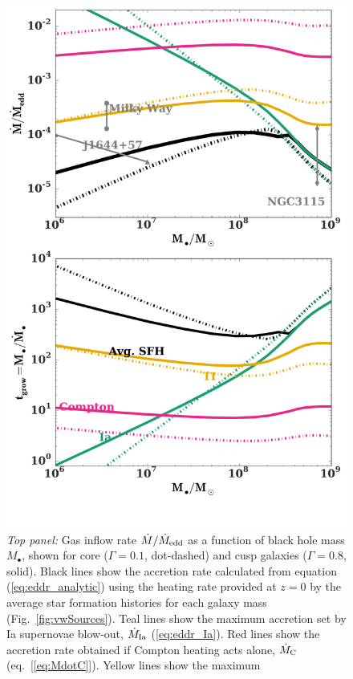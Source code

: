 \documentclass[usenatbib,fleqn]{mn2e}
\begin{document}
\begin{figure}
\includegraphics[width=\columnwidth]{mdot_sfr.pdf}
\caption{\label{fig:bh_growth} {\it Top panel:} Gas inflow rate $\dot{M}/\dot{M}_{\rm edd}$ as a
  function of black hole mass $M_{\bullet}$, shown for core
  ($\Gamma=0.1$, dot-dashed) and cusp galaxies ($\Gamma=0.8$, solid).
  Black lines show the accretion rate calculated from equation
  (\ref{eq:eddr_analytic}) using the heating rate provided at $z = 0$ by the average star formation histories for each galaxy mass (Fig.~\ref{fig:vwSources}).  Teal lines show the maximum accretion set by Ia supernovae blow-out, $\dot{M}_{\rm Ia}$ (\ref{eq:eddr_Ia}).  Red lines show the accretion rate obtained if Compton heating acts alone, $\dot{M}_{\rm C}$ (eq.~[\ref{eq:MdotC}]).  Yellow lines show the maximum
}
\end{figure}
\end{document}
